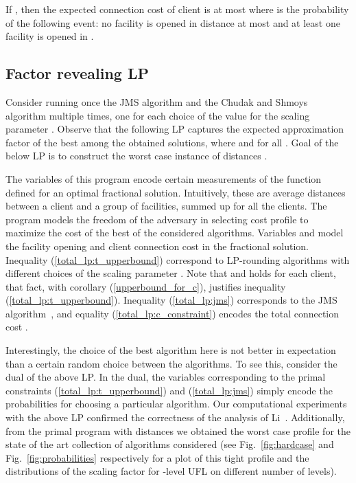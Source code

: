 \documentclass{llncs}
\begin{document}
 \begin{corollary}
 \label{upperbound_for_c}
  If , then the expected connection cost of client  is at most
   where  is the probability of the following event: no facility is opened in distance at most  and at least one facility is opened in .
 \end{corollary}

 \subsection{Factor revealing LP}
 Consider running once the JMS algorithm and the Chudak and Shmoys algorithm multiple times, one for each choice of the value for the scaling parameter . Observe that the following LP captures the expected approximation factor of the best among the obtained solutions, where   and  for all . Goal of the below LP is to construct the worst case instance of distances .
 
 
The variables of this program encode certain measurements of the function  defined for an optimal fractional solution. Intuitively, these are average distances
between a client and a group of facilities, summed up for all the clients. 
The program models the freedom of the adversary in selecting cost profile  to maximize the cost of the best of the considered algorithms. 
Variables  and  model the facility opening and client connection cost in the fractional solution. Inequality (\ref{total_lp:t_upperbound}) correspond to 
LP-rounding algorithms with different choices of the scaling parameter . Note that  and  holds for each client, that fact, with corollary (\ref{upperbound_for_c}), justifies inequality (\ref{total_lp:t_upperbound}). Inequality (\ref{total_lp:jms}) corresponds to the JMS algorithm~\cite{Jain}, 
and equality (\ref{total_lp:c_constraint}) encodes the total connection cost
.

Interestingly, the choice of the best algorithm here is not better in expectation than a certain random choice between the algorithms. To see this, consider the dual of the above LP. In the dual, the variables corresponding to the primal constraints (\ref{total_lp:t_upperbound}) and (\ref{total_lp:jms}) simply encode the probabilities for choosing a particular algorithm. Our computational experiments with the above LP confirmed the correctness of the analysis of Li~\cite{ShiLi}. Additionally, from the primal program with distances we obtained the worst case profile  for the state of the art collection of algorithms considered (see Fig.~\ref{fig:hardcase} and Fig.~\ref{fig:probabilities} respectively for a plot of this tight profile and the distributions of the scaling factor for -level UFL on different number of levels).
\end{document}
